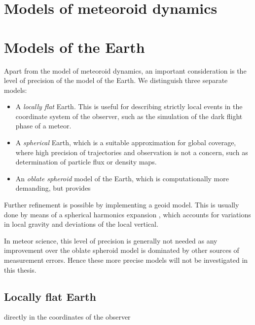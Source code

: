 



\section{Models of meteoroid dynamics} \label{mm}





\section{Models of the Earth}
    Apart from the model of meteoroid dynamics, an important consideration is the level of precision
    of the model of the Earth. We distinguish three separate models:

    \begin{itemize}
        \item A \emph{locally flat} Earth. This is useful for describing strictly local events
            in the coordinate system of the observer, such as the simulation of the dark flight phase of a meteor.
        \item A \emph{spherical} Earth, which is a suitable approximation for global coverage,
            where high precision of trajectories and observation is not a concern, such as determination
            of particle flux or density maps.
        \item An \emph{oblate spheroid} model of the Earth, which is computationally more demanding,
            but provides
    \end{itemize}

    Further refinement is possible by implementing a geoid model. This is usually done by means of
    a spherical harmonics expansion \cite{???}, which accounts for variations in local gravity
    and deviations of the local vertical.

    In meteor science, this level of precision is generally not needed as any improvement over the
    oblate spheroid model is dominated by other sources of measurement errors.
    Hence these more precise models will not be investigated in this thesis.



    \subsection{Locally flat Earth} \label{mmf}
     directly in the coordinates of the observer


